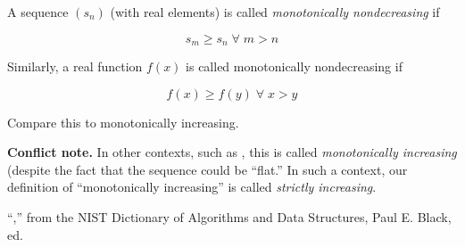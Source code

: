 \documentclass{article}
\begin{document}
A sequence $(s_n)$ (with real elements)  is called \emph{monotonically nondecreasing} if 

$$ s_m \ge s_n \;\forall\; m > n $$

Similarly, a real function $f(x)$ is called monotonically nondecreasing if 

$$ f(x) \ge f(y) \;\forall\; x > y $$

Compare this to monotonically increasing.

\textbf{Conflict note.}  In other contexts, such as \cite{NIST}, this is called \emph{monotonically increasing} (despite the fact that the sequence could be ``flat.''  In such a context, our definition of ``monotonically increasing'' is called \emph{strictly increasing}.

\begin{thebibliography}{3}
 ``,'' from the NIST Dictionary of Algorithms and Data Structures, Paul E. Black, ed.
\end{thebibliography}
\end{document}
